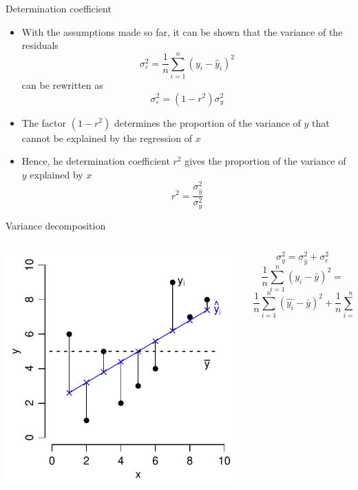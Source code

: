 \documentclass[aspectratio=169]{beamer}
\begin{document}
\begin{frame}{Determination coefficient}
  \begin{itemize}
    \item With the assumptions made so far, it can be shown that the variance of
      the residuals
      \[
      \sigma_{\varepsilon}^2 = \frac{1}{n}\sum_{i=1}^n (y_i - \hat y_i)^2
      \]
      can be rewritten as
      \[
        \sigma_{\varepsilon}^2 = (1 - r^2) \sigma_y^2
      \]
    \item The factor $(1 - r^2)$ determines the proportion of the variance of
      $y$ that cannot be explained by the regression of $x$
    \item Hence, he determination coefficient $r^2$ gives the proportion of the
      variance of $y$ explained by $x$
      \[
        r^2 = \frac{\sigma_{\hat y}^2}{\sigma_{y}^2}
      \]
  \end{itemize}
\end{frame}

\begin{frame}{Variance decomposition}
\begin{columns}[c]
\begin{column}{6cm}
  \includegraphics[scale=.7]{../figures/obs_pred}
\end{column}
%
\begin{column}{5cm}
{\small
\[
  \sigma_y^2 = \sigma_{\hat y}^2 + \sigma_e^2
\]
\[
  \frac{1}{n} \sum_{i=1}^n (y_i - \bar{y})^2 =
\]
\[
  \frac{1}{n} \sum_{i=1}^n (\hat{y_i} - \bar{y})^2 +
  \frac{1}{n} \sum_{i=1}^n (y_i - \hat{y_i})^2
\]
}
\end{column}
\end{columns}
\vfill
\end{frame}
\end{document}
